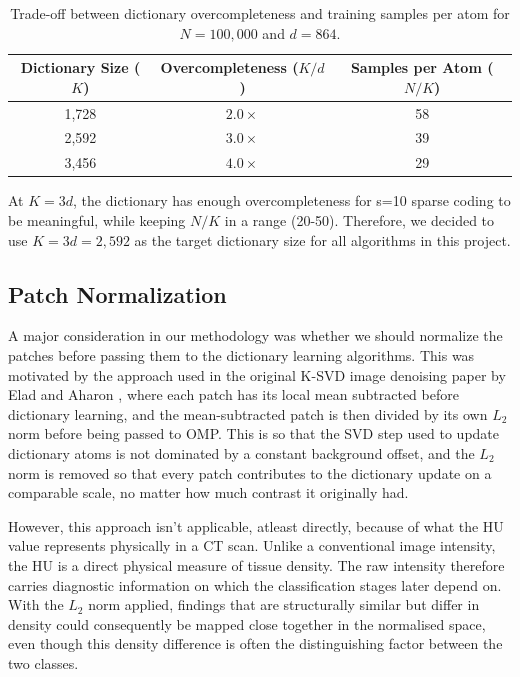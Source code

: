 \begin{table}[ht]
\centering
\caption{Trade-off between dictionary overcompleteness and training samples per atom for $N=100{,}000$ and $d=864$.}
\label{tab:dictionary_tradeoff}
\begin{tabular}{ccc}
\hline
\textbf{Dictionary Size ($K$)} & \textbf{Overcompleteness ($K/d$)} & \textbf{Samples per Atom ($N/K$)} \\
\hline
1,728 & $2.0\times$ & 58 \\
2,592 & $3.0\times$ & 39 \\
3,456 & $4.0\times$ & 29 \\
\hline
\end{tabular}
\end{table}

At $K=3d$, the dictionary has enough overcompleteness for s=10 sparse coding to be meaningful, while keeping $N/K$ in a range (20-50).
Therefore, we decided to use $K=3d=2{,}592$ as the target dictionary size for all algorithms in this project.

\subsection{Patch Normalization}
\label{sec:patch-normalization}

A major consideration in our methodology was whether we should normalize the patches before passing them to the dictionary learning algorithms.
This was motivated by the approach used in the original K-SVD image denoising paper by Elad and Aharon \cite{elad2006image},
where each patch has its local mean subtracted before dictionary learning, and the mean-subtracted patch is then divided by
its own $L_2$ norm before being passed to OMP. This is so that the SVD step used to update dictionary atoms is not dominated by a
constant background offset, and the $L_2$ norm is removed so that every patch contributes to the dictionary update on a comparable
scale, no matter how much contrast it originally had.

However, this approach isn't applicable, atleast directly, because of what the HU value represents physically in a CT scan.
Unlike a conventional image intensity, the HU is a direct physical measure of tissue density. The raw intensity therefore carries
diagnostic information on which the classification stages later depend on.
With the $L_2$ norm applied, findings that are structurally similar but differ in density could consequently be mapped close
together in the normalised space, even though this density difference is often the distinguishing factor between the two classes.

